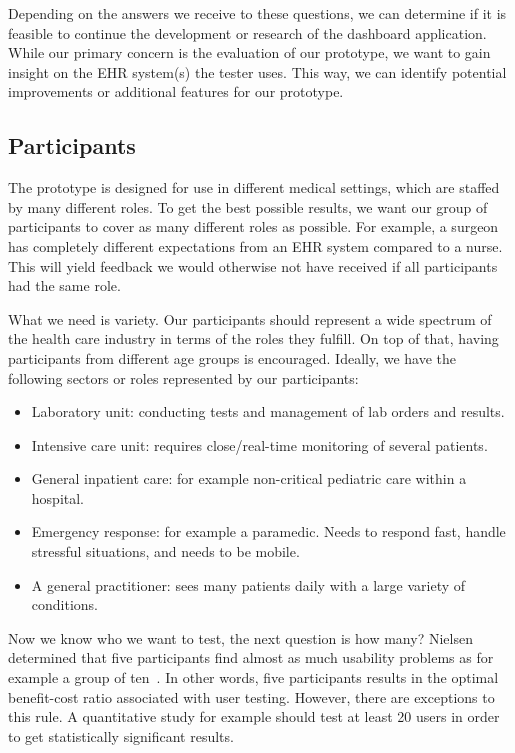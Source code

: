     \noindent Depending on the answers we receive to these questions, we can determine if it is feasible to continue the development or research of the dashboard application. While our primary concern is the evaluation of our prototype, we want to gain insight on the EHR system(s) the tester uses. This way, we can identify potential improvements or additional features for our prototype. %

    \subsection{Participants}

    The prototype is designed for use in different medical settings, which are staffed by many different roles. To get the best possible results, we want our group of participants to cover as many different roles as possible. For example, a surgeon has completely different expectations from an EHR system compared to a nurse. This will yield feedback we would otherwise not have received if all participants had the same role.

    What we need is variety. Our participants should represent a wide spectrum of the health care industry in terms of the roles they fulfill. On top of that, having participants from different age groups is encouraged. Ideally, we have the following sectors or roles represented by our participants:
    \begin{itemize}
        \item Laboratory unit: conducting tests and management of lab orders and results.
        \item Intensive care unit: requires close/real-time monitoring of several patients.
        \item General inpatient care: for example non-critical pediatric care within a hospital.
        \item Emergency response: for example a paramedic. Needs to respond fast, handle stressful situations, and needs to be mobile.
        \item A general practitioner: sees many patients daily with a large variety of conditions.
    \end{itemize}

    Now we know who we want to test, the next question is how many? Nielsen determined that five participants find almost as much usability problems as for example a group of ten~\cite{Nielsen2012}. In other words, five participants results in the optimal benefit-cost ratio associated with user testing. However, there are exceptions to this rule. A quantitative study for example should test at least 20 users in order to get statistically significant results.

